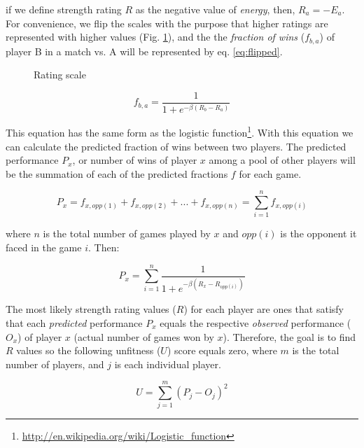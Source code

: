 \documentclass[12pt]{article}
\begin{document}
if we define strength rating $R$ as the negative value of \textit{energy}, then, $R_{a} = -E_{a}$.
For convenience, we flip the scales with the purpose that higher ratings are represented with higher values (Fig. \ref{fig:figlevels2}), and the the \textit{fraction of wins} ($f_{b,a}$) of player B in a match vs. A will be represented by eq. \ref{eq:flipped}.

	\begin{figure}[htb]
	\caption{\label{fig:figlevels2} Rating scale}
	\end{figure}


	\begin{equation} \label{eq:flipped}
	f_{b,a}  = \frac{1}{1 + e^{-\beta(R_{b}-R_{a})}}
	\end{equation}

This equation has the same form as the logistic function\footnote{\url{http://en.wikipedia.org/wiki/Logistic_function}}.
With this equation we can calculate the predicted fraction of wins between two players. 
The predicted performance $P_{x}$, or number of wins of player $x$ among a pool of other players will be the summation of each of the predicted fractions $f$ for each game.

	\begin{equation}
	P_{x} = f_{x,opp(1)} + f_{x,opp(2)} + ... + f_{x,opp(n)} = \sum\limits_{i=1}^n f_{x,opp(i)}
	\end{equation}

where $n$ is the total number of games played by $x$ and $opp(i)$ is the opponent it faced in the game $i$. Then:

	\begin{equation}
	P_{x} = \sum\limits_{i=1}^n \frac{1}{1 + e^{-\beta(R_{x}-R_{opp(i)})}}
	\end{equation}

The most likely strength rating values ($R$) for each player are ones that satisfy that each \textit{predicted} performance $P_{x}$ equals the respective \textit{observed} performance ($O_{x}$) of player $x$ (actual number of games won by $x$). 
Therefore, the goal is to find $R$ values so the following unfitness ($U$) score equals zero, where $m$ is the total number of players, and $j$ is each individual player.

	\begin{equation}
	U = \sum\limits_{j=1}^m (P_{j} - O_{j})^2
	\end{equation}
\end{document}
